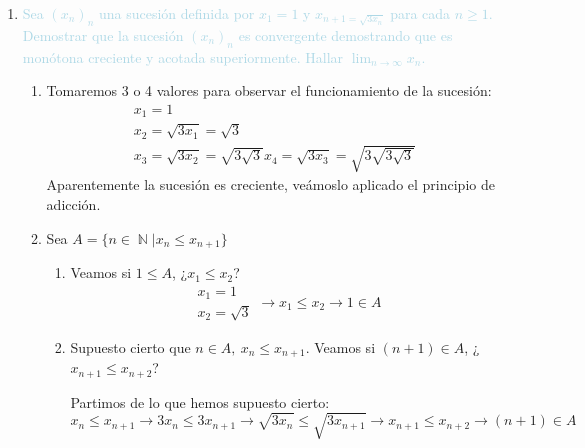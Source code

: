\documentclass[12pt]{article}
\newcommand{\bboxed}[1]{\fcolorbox{lightblue}{lightblue!10}{$#1$}}
\newcommand{\lb}[1]{\textcolor{lightblue}{#1}}
\DeclareMathOperator{\N}{\mathbb{N}}
\begin{document}
\begin{enumerate}[label=\color{red}\textbf{\arabic*}),leftmargin=*, start=27]
\begin{enumerate}[label=\color{lightblue}\arabic*)]
\begin{enumerate}[label=\color{lightblue}\roman*)]
      Por lo tanto $A=\N\longrightarrow\bboxed{\text{$x_n$ está acotada superiormente por 2}}$
\end{enumerate}
Como $x_n$ es creciente y acotada superiormente $\longrightarrow x_n$ es convergente $\longrightarrow\bboxed{L=\dfrac{1+\sqrt{5}}{2}}$
\end{enumerate}
\item \lb{Sea $(x_n)_n$ una sucesión definida por $x_1=1$ y $x_{n+1=\sqrt{3x_n}}$ para cada $n\ge1$. Demostrar que la sucesión $(x_n)_n$ es convergente demostrando que es monótona creciente y acotada superiormente. Hallar $\lim_{n\to\infty}x_n$.}
\begin{enumerate}[label=\color{lightblue}\arabic*)]
      \item Tomaremos 3 o 4 valores para observar el funcionamiento de la sucesión: \[ \begin{array}{l}
            x_1=1\\
            x_2=\sqrt{3x_1}=\sqrt{3}\\
            x_3=\sqrt{3x_2}=\sqrt{3\sqrt{3}}
            x_4=\sqrt{3x_3}=\sqrt{3\sqrt{3\sqrt{3}}}
      \end{array} \] Aparentemente la sucesión es creciente, veámoslo aplicado el principio de adicción.
      \item Sea $A=\{n\in\N|x_n\le x_{n+1}\}$
      \begin{enumerate}[label=\color{lightblue}\roman*)]
            \item Veamos si $1\le A$, ¿$x_1\le x_2$? \[ \begin{array}{l}
                  x_1=1\\
                  x_2=\sqrt{3}
            \end{array}\longrightarrow x_1\le x_2\longrightarrow1\in A \]
            \item Supuesto cierto que $n\in A,\:x_n\le x_{n+1}$. Veamos si $(n+1)\in A$, ¿$x_{n+1}\le x_{n+2}$? 
            
            Partimos de lo que hemos supuesto cierto: $$x_n\le x_{n+1}\longrightarrow 3x_n\le3x_{n+1}\longrightarrow \sqrt{3x_n}\le\sqrt{3x_{n+1}}\longrightarrow x_{n+1}\le x_{n+2}\longrightarrow(n+1)\in A$$


\end{enumerate}
\end{enumerate}
\end{enumerate}
\end{document}
